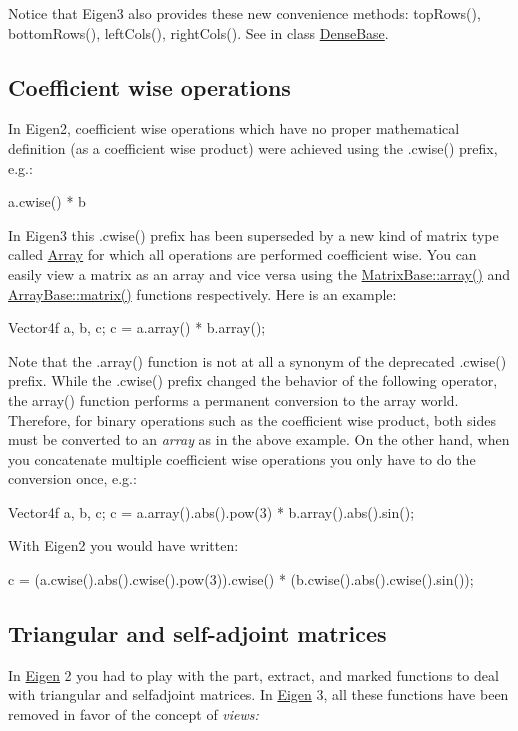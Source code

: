 Notice that Eigen3 also provides these new convenience methods\+: top\+Rows(), bottom\+Rows(), left\+Cols(), right\+Cols(). See in class \hyperlink{group___core___module_class_eigen_1_1_dense_base}{Dense\+Base}.\hypertarget{_eigen2_to_eigen3_CoefficientWiseOperations}{}\subsection{Coefficient wise operations}\label{_eigen2_to_eigen3_CoefficientWiseOperations}
In Eigen2, coefficient wise operations which have no proper mathematical definition (as a coefficient wise product) were achieved using the .cwise() prefix, e.\+g.\+: 
\begin{DoxyCode}
a.cwise() * b 
\end{DoxyCode}
 In Eigen3 this .cwise() prefix has been superseded by a new kind of matrix type called \hyperlink{group___core___module_class_eigen_1_1_array}{Array} for which all operations are performed coefficient wise. You can easily view a matrix as an array and vice versa using the \hyperlink{group___core___module_a76a9dcb91ec82fbd6e74ca2ac2ae0e07}{Matrix\+Base\+::array()} and \hyperlink{group___core___module_ac513167ec762bbf639dc375d314d91d3}{Array\+Base\+::matrix()} functions respectively. Here is an example\+: 
\begin{DoxyCode}
Vector4f a, b, c;
c = a.array() * b.array();
\end{DoxyCode}
 Note that the .array() function is not at all a synonym of the deprecated .cwise() prefix. While the .cwise() prefix changed the behavior of the following operator, the array() function performs a permanent conversion to the array world. Therefore, for binary operations such as the coefficient wise product, both sides must be converted to an {\itshape array} as in the above example. On the other hand, when you concatenate multiple coefficient wise operations you only have to do the conversion once, e.\+g.\+: 
\begin{DoxyCode}
Vector4f a, b, c;
c = a.array().abs().pow(3) * b.array().abs().sin();
\end{DoxyCode}
 With Eigen2 you would have written\+: 
\begin{DoxyCode}
c = (a.cwise().abs().cwise().pow(3)).cwise() * (b.cwise().abs().cwise().sin());
\end{DoxyCode}
\hypertarget{_eigen2_to_eigen3_PartAndExtract}{}\subsection{Triangular and self-\/adjoint matrices}\label{_eigen2_to_eigen3_PartAndExtract}
In \hyperlink{namespace_eigen}{Eigen} 2 you had to play with the part, extract, and marked functions to deal with triangular and selfadjoint matrices. In \hyperlink{namespace_eigen}{Eigen} 3, all these functions have been removed in favor of the concept of {\itshape views\+:} 

